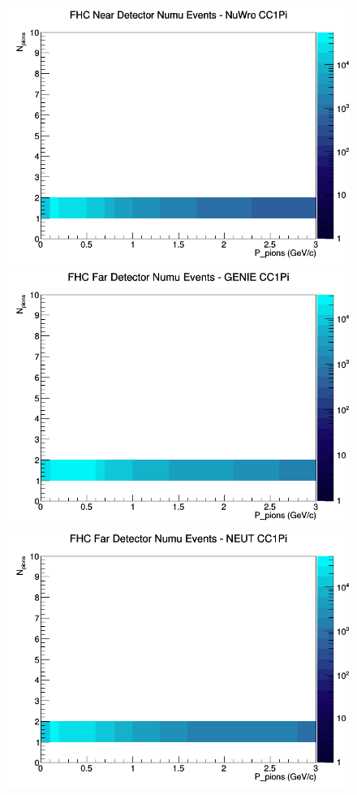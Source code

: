 \documentclass[12pt]{article}
\begin{document}
\begin{figure}[h]
\includegraphics[width=\linewidth]{N_P/nominal/pions/CC1Pi_FHC_ND_numu_N_P_NuWro.png}
\endminipage
\newline
{}
\includegraphics[width=\linewidth]{N_P/nominal/pions/CC1Pi_FHC_FD_numu_N_P_GENIE.png}
\endminipage
{}
\includegraphics[width=\linewidth]{N_P/nominal/pions/CC1Pi_FHC_FD_numu_N_P_NEUT.png}

\end{figure}
\end{document}
